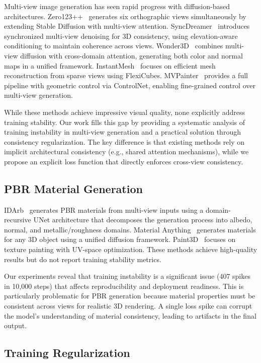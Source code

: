 \documentclass{article}
\begin{document}
Multi-view image generation has seen rapid progress with diffusion-based architectures. Zero123++~\cite{zero123pp} generates six orthographic views simultaneously by extending Stable Diffusion with multi-view attention. SyncDreamer~\cite{syncdreamer} introduces synchronized multi-view denoising for 3D consistency, using elevation-aware conditioning to maintain coherence across views. Wonder3D~\cite{wonder3d} combines multi-view diffusion with cross-domain attention, generating both color and normal maps in a unified framework. InstantMesh~\cite{instantmesh} focuses on efficient mesh reconstruction from sparse views using FlexiCubes. MVPainter~\cite{mvpainter} provides a full pipeline with geometric control via ControlNet, enabling fine-grained control over multi-view generation.

While these methods achieve impressive visual quality, none explicitly address training stability. Our work fills this gap by providing a systematic analysis of training instability in multi-view generation and a practical solution through consistency regularization. The key difference is that existing methods rely on implicit architectural consistency (e.g., shared attention mechanisms), while we propose an explicit loss function that directly enforces cross-view consistency.

\subsection{PBR Material Generation}

IDArb~\cite{idarb} generates PBR materials from multi-view inputs using a domain-recursive UNet architecture that decomposes the generation process into albedo, normal, and metallic/roughness domains. Material Anything~\cite{materialanything} generates materials for any 3D object using a unified diffusion framework. Paint3D~\cite{paint3d} focuses on texture painting with UV-space optimization. These methods achieve high-quality results but do not report training stability metrics.

Our experiments reveal that training instability is a significant issue (407 spikes in 10,000 steps) that affects reproducibility and deployment readiness. This is particularly problematic for PBR generation because material properties must be consistent across views for realistic 3D rendering. A single loss spike can corrupt the model's understanding of material consistency, leading to artifacts in the final output.

\subsection{Training Regularization}
\end{document}
